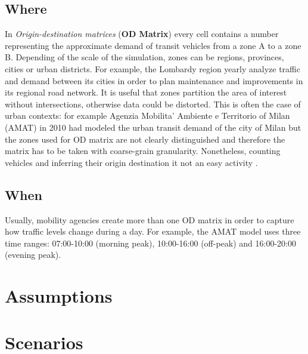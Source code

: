 \subsection{Where}

In \textit{Origin-destination matrices} (\textbf{OD Matrix}) every cell contains a number representing the approximate demand of transit vehicles from a zone A to a zone B. Depending of the scale of the simulation, zones can be regions, provinces, cities or urban districts.
For example, the Lombardy region yearly analyze traffic and demand between its cities in order to plan maintenance and improvements in its regional road network.
It is useful that zones partition the area of interest without intersections, otherwise data could be distorted. This is often the case of urban contexts: for example Agenzia Mobilita' Ambiente e Territorio of Milan (AMAT) in 2010 had modeled the urban transit demand of the city of Milan but the zones used for OD matrix are not clearly distinguished and therefore the matrix has to be taken with coarse-grain granularity.
Nonetheless, counting vehicles and inferring their origin destination it not an easy activity \cite{bell1983estimation}.

\subsection{When}

Usually, mobility agencies create more than one OD matrix in order to capture how traffic levels change during a day. For example, the AMAT model uses three time ranges: 07:00-10:00 (morning peak), 10:00-16:00 (off-peak) and 16:00-20:00 (evening peak). 


\section{Assumptions}


\section{Scenarios}

